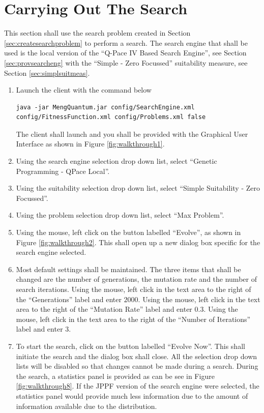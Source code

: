 \section{Carrying Out The Search}
\label{sec:carryingoutthesearch}

This section shall use the search problem created in Section \ref{sec:createsearchproblem} to perform a search.
The search engine that shall be used is the local version of the ``Q-Pace IV Based Search Engine'', see Section \ref{sec:provsearcheng} with the ``Simple - Zero Focussed'' suitability measure, see Section \ref{sec:simplsuitmeas}.

\begin{enumerate}
 \item Launch the client with the command below
\begin{lstlisting}
java -jar MengQuantum.jar config/SearchEngine.xml config/FitnessFunction.xml config/Problems.xml false
\end{lstlisting}
The client shall launch and you shall be provided with the Graphical User Interface as shown in Figure \ref{fig:walkthrough1}.

\item Using the search engine selection drop down list, select ``Genetic Programming - QPace Local''.

\item Using the suitability selection drop down list, select ``Simple Suitability - Zero Focussed''.

\item Using the problem selection drop down list, select ``Max Problem''.

\item Using the mouse, left click on the button labelled ``Evolve'', as shown in Figure \ref{fig:walkthrough2}.
This shall open up a new dialog box specific for the search engine selected.

\item \label{enum:searchsettings} Most default settings shall be maintained.
The three items that shall be changed are the number of generations, the mutation rate and the number of search iterations.
Using the mouse, left click in the text area to the right of the ``Generations'' label and enter $2000$.
Using the mouse, left click in the text area to the right of the ``Mutation Rate'' label and enter $0.3$.
Using the mouse, left click in the text area to the right of the ``Number of Iterations'' label and enter $3$.

\item To start the search, click on the button labelled ``Evolve Now''.
This shall initiate the search and the dialog box shall close.
All the selection drop down lists will be disabled so that changes cannot be made during a search.
During the search, a statistics panel is provided as can be see in Figure \ref{fig:walkthrough8}.
If the JPPF version of the search engine were selected,  the statistics panel would provide much less information due to the amount of information available due to the distribution.


\end{enumerate}
